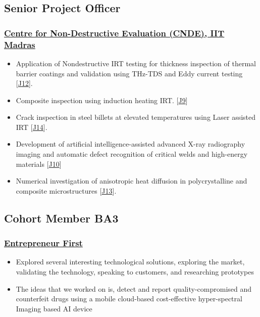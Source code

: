 \documentclass{my_cv}%
\begin{document}
\subsection{Senior Project Officer}
\subsubsection{\href{https://www.cnde.in/}{Centre for Non-Destructive Evaluation (CNDE), IIT Madras}}
\begin{itemize}[leftmargin=0.15in]
\setlength\itemsep{-0.1em}
\color{mygray}
\item Application of Nondestructive IRT testing for thickness inspection of thermal barrier coatings and validation using THz-TDS and Eddy current testing [\textcolor{mypink}{\hyperref[J12]{J12}}].
\item Composite inspection using induction heating IRT. [\textcolor{mypink}{\hyperref[J9]{J9}}]
\item Crack inspection in steel billets at elevated temperatures using Laser assisted IRT [\textcolor{mypink}{\hyperref[J14]{J14}}].
\item Development of artificial intelligence-assisted advanced X-ray radiography imaging and automatic defect recognition of critical welds and high-energy materials [\textcolor{mypink}{\hyperref[J10]{J10}}]
\item Numerical investigation of anisotropic heat diffusion in polycrystalline and composite microstructures [\textcolor{mypink}{\hyperref[J13]{J13}}].
\end{itemize}%
{\color{mygray1} \hdashrule[0.1ex]{18.8cm}{0.2mm}{1mm}}
\subsection{Cohort Member BA3}
\subsubsection{\href{https://www.joinef.com/}{Entrepreneur First}}
\begin{itemize}[leftmargin=0.15in]
\setlength\itemsep{-0.1em}
\color{mygray}
\item Explored several interesting technological solutions, exploring the market, validating the technology, speaking to customers, and researching prototypes
\item The ideas that we worked on is, detect and report quality-compromised and counterfeit drugs using a mobile cloud-based cost-effective hyper-spectral Imaging based AI device
\end{itemize}
{\color{mygray1} \hdashrule[0.1ex]{18.8cm}{0.2mm}{1mm}}
\end{document}
